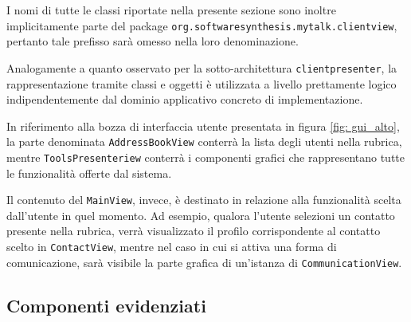 I nomi di tutte le classi riportate nella presente sezione sono inoltre implicitamente parte del package \texttt{org.softwaresynthesis.mytalk.clientview}, pertanto tale prefisso sarà omesso nella loro denominazione.

Analogamente a quanto osservato per la sotto-architettura \texttt{clientpresenter}, la rappresentazione tramite classi e oggetti è utilizzata a livello prettamente logico indipendentemente dal dominio applicativo concreto di implementazione.

In riferimento alla bozza di interfaccia utente presentata in figura \vref{fig: gui_alto}, la parte denominata \texttt{AddressBookView} conterrà la lista degli utenti nella rubrica, mentre \texttt{ToolsPresenteriew} conterrà i componenti grafici che rappresentano tutte le funzionalità offerte dal sistema. 

Il contenuto del \texttt{MainView}, invece, è destinato in relazione alla funzionalità scelta dall'utente in quel momento. Ad esempio, qualora l'utente selezioni un contatto presente nella rubrica, verrà visualizzato il profilo corrispondente al contatto scelto in \texttt{ContactView}, mentre nel caso in cui si attiva una forma di comunicazione, sarà visibile la parte grafica di un'istanza di \texttt{CommunicationView}.

\subsection{Componenti evidenziati}

